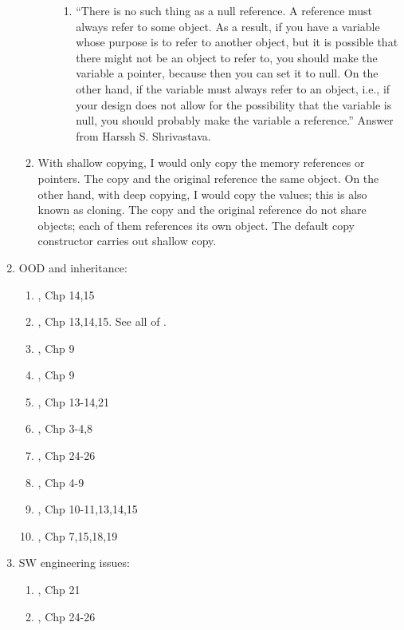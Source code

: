 \begin{enumerate}
\begin{enumerate}
\begin{enumerate}
\begin{enumerate}
			\item ``There is no such thing as a null reference. A reference must always refer to some object. As a result, if you have a variable whose purpose is to refer to another object, but it is possible that there might not be an object to refer to, you should make the variable a pointer, because then you can set it to null. On the other hand, if the variable must always refer to an object, i.e., if your design does not allow for the possibility that the variable is null, you should probably make the variable a reference.'' Answer from Harssh S. Shrivastava.
			\end{enumerate}
		\end{enumerate}
	\item With shallow copying, I would only copy the memory references or pointers. The copy and the original reference the same object. On the other hand, with deep copying, I would copy the values; this is also known as cloning. The copy and the original reference do not share objects; each of them references its own object. The default copy constructor carries out shallow copy.
	\end{enumerate}
\item OOD and inheritance: \vspace{-0.3cm}
	\begin{enumerate} \itemsep -2pt
	\item \cite{Eckel2000}, Chp 14,15
	\item \cite{Gaddis2010}, Chp 13,14,15. See all of \cite{Gaddis2010,Gaddis2011,Gaddis2012}.
	\item \cite{Stroustrup2014}, Chp 9
	\item \cite{Stroustrup2009}, Chp 9
	\item \cite{Oualline2003}, Chp 13-14,21
	\item \cite{Vermeir2001}, Chp 3-4,8
	\item \cite{Allain2012}, Chp 24-26
	\item \cite{Gregoire2014}, Chp 4-9
	\item \cite{Prata2012}, Chp 10-11,13,14,15
	\item \cite{Lippman2013}, Chp 7,15,18,19
	\end{enumerate}
\item SW engineering issues: \vspace{-0.3cm}
	\begin{enumerate} \itemsep -2pt
	\item \cite{Allain2012}, Chp 21
	\item \cite{Gregoire2014}, Chp 24-26

\end{enumerate}
\end{enumerate}
